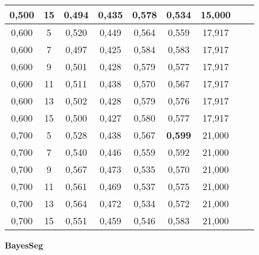 \documentclass{article}
\begin{document}
\begin{longtable}[c]{|c|c|c|c|c|c|c|c|c|}
 0,500 & 15 & 0,494 & 0,435 & 0,578 & 0,534 & 15,000  \\ \hline 
 0,600 & 5 & 0,520 & 0,449 & 0,564 & 0,559 & 17,917  \\ \hline 
 0,600 & 7 & 0,497 & 0,425 & 0,584 & 0,583 & 17,917  \\ \hline 
 0,600 & 9 & 0,501 & 0,428 & 0,579 & 0,577 & 17,917  \\ \hline 
 0,600 & 11 & 0,511 & 0,438 & 0,570 & 0,567 & 17,917  \\ \hline 
 0,600 & 13 & 0,502 & 0,428 & 0,579 & 0,576 & 17,917  \\ \hline 
 0,600 & 15 & 0,500 & 0,427 & 0,580 & 0,577 & 17,917  \\ \hline 
 0,700 & 5 & 0,528 & 0,438 & 0,567 & \cellcolor{gray!20} \textbf{0,599} & 21,000  \\ \hline 
 0,700 & 7 & 0,540 & 0,446 & 0,559 & 0,592 & 21,000  \\ \hline 
 0,700 & 9 & 0,567 & 0,473 & 0,535 & 0,570 & 21,000  \\ \hline 
 0,700 & 11 & 0,561 & 0,469 & 0,537 & 0,575 & 21,000  \\ \hline 
 0,700 & 13 & 0,564 & 0,472 & 0,534 & 0,572 & 21,000  \\ \hline 
 0,700 & 15 & 0,551 & 0,459 & 0,546 & 0,583 & 21,000  \\ \hline 
 \end{longtable} 

\newpage

{  
\large
\center
	\textbf{BayesSeg}  

}
\end{document}
